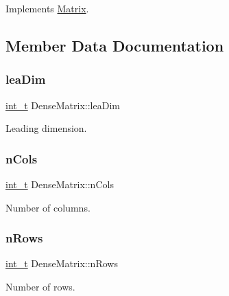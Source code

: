 Implements \hyperlink{class_matrix_a1504bb1a207b6e5d3320289e4af84400}{Matrix}.



\subsection{Member Data Documentation}
\mbox{\label{class_dense_matrix_aef0770dde876311b257607ce5aeba74d}} 
\subsubsection{\texorpdfstring{lea\+Dim}{leaDim}}
{\footnotesize\ttfamily \hyperlink{_types_8hpp_ab6fd6105e64ed14a0c9281326f05e623}{int\+\_\+t} Dense\+Matrix\+::lea\+Dim\hspace{0.3cm}{\ttfamily [protected]}}

Leading dimension. \mbox{\label{class_dense_matrix_a00810a0c8d40c606c6eea0bfaccbb656}} 
\subsubsection{\texorpdfstring{n\+Cols}{nCols}}
{\footnotesize\ttfamily \hyperlink{_types_8hpp_ab6fd6105e64ed14a0c9281326f05e623}{int\+\_\+t} Dense\+Matrix\+::n\+Cols\hspace{0.3cm}{\ttfamily [protected]}}

Number of columns. \mbox{\label{class_dense_matrix_a683ce6b9b1c1b77256eddd9b678a4fab}} 
\subsubsection{\texorpdfstring{n\+Rows}{nRows}}
{\footnotesize\ttfamily \hyperlink{_types_8hpp_ab6fd6105e64ed14a0c9281326f05e623}{int\+\_\+t} Dense\+Matrix\+::n\+Rows\hspace{0.3cm}{\ttfamily [protected]}}

Number of rows. \mbox{\label{class_dense_matrix_a7de2a860c753fae01ba92b2d204d71bd}} 
